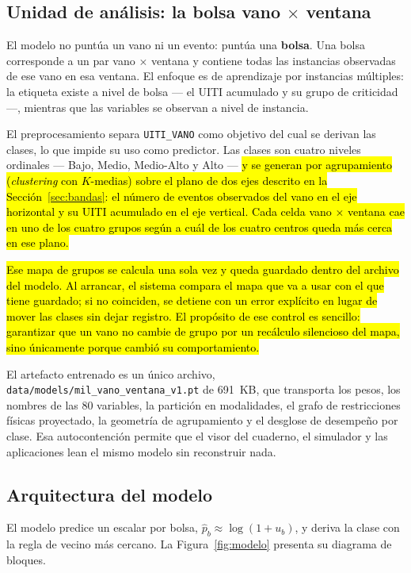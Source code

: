 \documentclass[11pt,a4paper]{article}
\newcommand{\nv}[1]{\hl{#1}}
\begin{document}
\subsection{Unidad de análisis: la bolsa vano $\times$ ventana}

El modelo no puntúa un vano ni un evento: puntúa una \textbf{bolsa}. Una bolsa corresponde a un
par vano $\times$ ventana y contiene todas las instancias observadas de ese vano en esa
ventana. El enfoque es de aprendizaje por instancias múltiples: la etiqueta existe a nivel de
bolsa --- el UITI acumulado y su grupo de criticidad ---, mientras que las variables se
observan a nivel de instancia.

El preprocesamiento separa \texttt{UITI\_VANO} como objetivo del cual se derivan las clases, lo
que impide su uso como predictor. Las clases son cuatro niveles ordinales --- Bajo, Medio,
Medio-Alto y Alto --- \nv{y se generan por agrupamiento (\emph{clustering} con
\mbox{$K$-medias}) sobre el plano de dos ejes descrito en la
Sección~\mbox{\ref{sec:bandas}}: el número de eventos observados del vano en el eje
horizontal y su UITI acumulado en el eje vertical. Cada celda vano \mbox{$\times$} ventana
cae en uno de los cuatro grupos según a cuál de los cuatro centros queda más cerca en ese
plano.}

\nv{Ese mapa de grupos se calcula una sola vez y queda guardado dentro del archivo del
modelo. Al arrancar, el sistema compara el mapa que va a usar con el que tiene guardado; si
no coinciden, se detiene con un error explícito en lugar de mover las clases sin dejar
registro. El propósito de ese control es sencillo: garantizar que un vano no cambie de
grupo por un recálculo silencioso del mapa, sino únicamente porque cambió su
comportamiento.}

El artefacto entrenado es un único archivo, \texttt{data/models/mil\_vano\_ventana\_v1.pt} de
691~KB, que transporta los pesos, los nombres de las 80 variables, la partición en
modalidades, el grafo de restricciones físicas proyectado, la geometría de agrupamiento y el
desglose de desempeño por clase. Esa autocontención permite que el visor del cuaderno, el
simulador y las aplicaciones lean el mismo modelo sin reconstruir nada.

\subsection{Arquitectura del modelo}

El modelo predice un escalar por bolsa, $\hat{p}_b \approx \log(1 + u_b)$, y deriva la clase con
la regla de vecino más cercano. La Figura~\ref{fig:modelo} presenta su diagrama de bloques.
\end{document}
